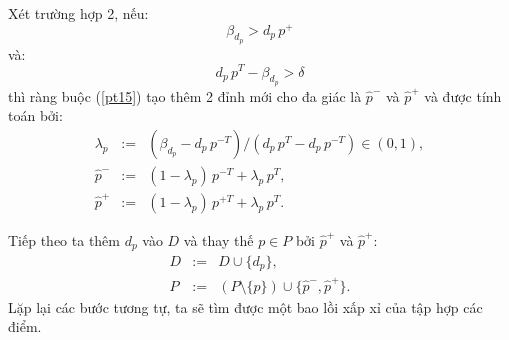 \documentclass[11pt]{beamer}
\theoremstyle{definition}
\theoremstyle{plain}
\theoremstyle{plain}
\theoremstyle{remark}
\begin{document}
	\begin{frame}
		Xét trường hợp 2, nếu:
		\begin{equation}\label{betagreater}
			\beta_{d_p} > d_p\, p^+
		\end{equation}
		và:
		\begin{equation}\label{greaterdelta}
			d_{p}\, p^T - \beta_{d_{p}} > \delta
		\end{equation}
		thì ràng buộc (\ref{pt15}) tạo thêm 2 đỉnh mới cho đa giác là $\hat p^-$ và $\hat p^+$ và được tính toán bởi:
		\begin{equation}\label{def_hatp}
			\begin{array}{lcl}
				\lambda_p &:=& (\beta_{d_p} - d_p\, p^{-T})/(d_p\, p^T - d_p\, p^{-T}) \in (0, 1), \\
				\hat p^- &:=& (1 - \lambda_p)\, p^{-T} + \lambda_p\, p^T, \\
				\hat p^+ &:=& (1 - \lambda_p)\, p^{+T} + \lambda_p\, p^T.
			\end{array}
		\end{equation}
	\end{frame}
	
	\begin{frame}
		Tiếp theo ta thêm $d_p$ vào $D$ và thay thế $p \in P$ bởi $\hat p^+$ và $\hat p^+$:
		\begin{equation}\label{newDP1}
			\begin{array}{lcl}
				D &:=& D \cup \{d_{p}\}, \\
				P &:=&(P \setminus \{p\}) \cup \{\hat p^-, \hat p^+\}.
			\end{array}
		\end{equation}
		Lặp lại các bước tương tự, ta sẽ tìm được một bao lồi xấp xỉ của tập hợp các điểm.
	\end{frame}
	
\end{document}
